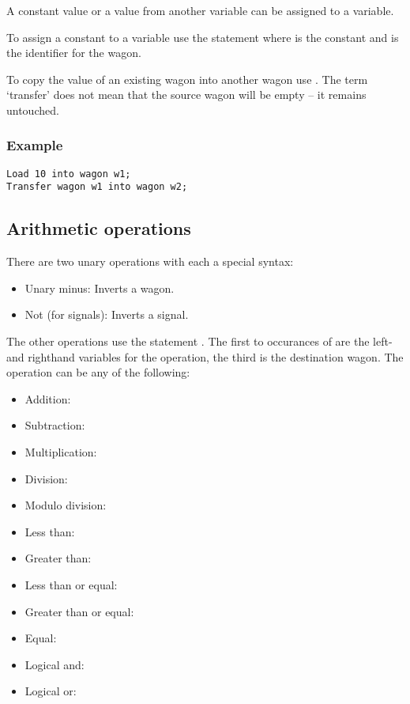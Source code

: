 A constant value or a value from another variable can be assigned to a variable.

To assign a constant to a variable use the statement  where  is the constant and  is the identifier for the wagon.

To copy the value of an existing wagon into another wagon use . The term `transfer' does not mean that the source wagon will be empty -- it remains untouched.

\subsubsection*{Example}

\begin{lstlisting}
Load 10 into wagon w1;
Transfer wagon w1 into wagon w2;
\end{lstlisting}

\subsection{Arithmetic operations}

There are two unary operations with each a special syntax:

\begin{itemize}
\item Unary minus: Inverts a wagon. \\ 
\item Not (for signals): Inverts a signal. \\ 
\end{itemize}

The other operations use the statement . The first to occurances of  are the left- and righthand variables for the operation, the third  is the destination wagon. The operation  can be any of the following:

\begin{itemize}
\item Addition: 
\item Subtraction: 
\item Multiplication: 
\item Division: 
\item Modulo division: 
\item Less than: 
\item Greater than: 
\item Less than or equal: 
\item Greater than or equal: 
\item Equal: 
\item Logical and: 
\item Logical or: 
\end{itemize}

